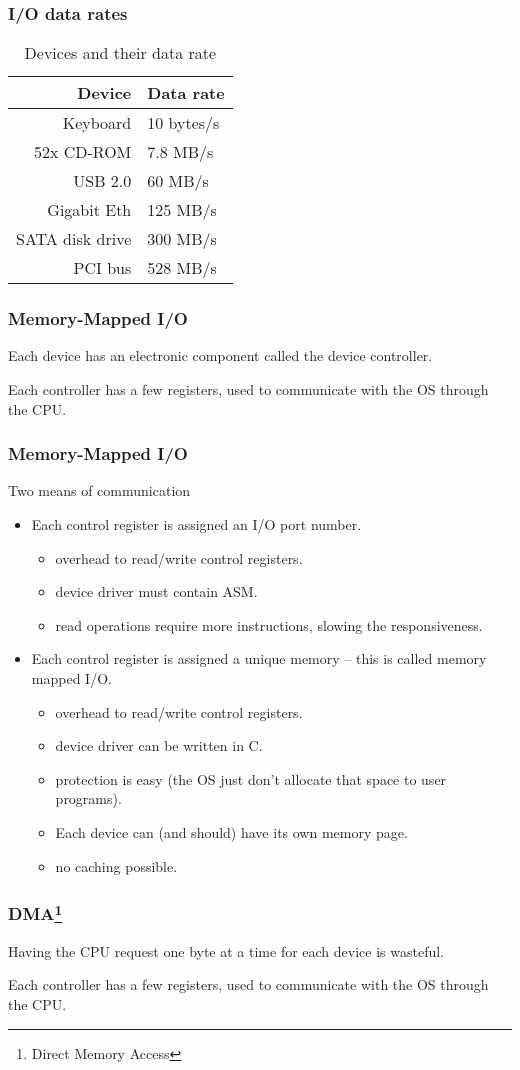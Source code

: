 \begin{frame}
  \frametitle{I/O data rates}
    \begin{center}
      \begin{table}
        \begin{tabular}{ r | l }
          \hline
          Device      & Data rate \\ \hline \hline
          Keyboard    & 10 bytes/s \\ \hline
          52x CD-ROM  & 7.8 MB/s \\ \hline
          USB 2.0     & 60 MB/s \\ \hline
          Gigabit Eth & 125 MB/s \\ \hline
          SATA disk drive & 300 MB/s \\ \hline
          PCI bus     & 528 MB/s \\
          \hline
        \end{tabular}
        \caption{Devices and their data rate}
      \end{table}
    \end{center}
\end{frame}

\begin{frame}
  \frametitle{Memory-Mapped I/O}
  Each device has an electronic component called the device controller.

  Each controller has a few registers, used to communicate with the OS through the CPU.
\end{frame}

\begin{frame}
\frametitle{Memory-Mapped I/O}
  \begin{block}{Two means of communication}
    \begin{itemize}
      \item Each control register is assigned an I/O port number.
    \begin{itemize}
      \item overhead to read/write control registers.
      \item device driver must contain ASM.
      \item read operations require more instructions, slowing the responsiveness.
    \end{itemize}
      \item Each control register is assigned a unique memory -- this is called memory mapped I/O.
    \begin{itemize}
      \item overhead to read/write control registers.
      \item device driver can be written in C.
      \item protection is easy (the OS just don't allocate that space to user programs).
      \item Each device can (and should) have its own memory page.
      \item no caching possible.
    \end{itemize}
    \end{itemize}
  \end{block}
\end{frame}

\begin{frame}
  \frametitle{DMA\footnote{Direct Memory Access}}
  Having the CPU request one byte at a time for each device is wasteful.

  Each controller has a few registers, used to communicate with the OS through the CPU.
\end{frame}

